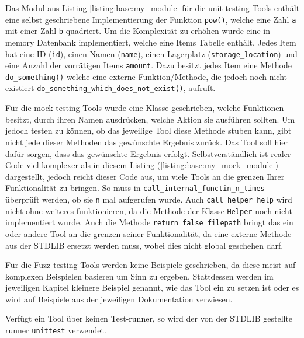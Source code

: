 Das Modul aus Listing \ref{listing:base:my_module} für die unit-testing Tools
enthält eine selbst geschriebene Implementierung der Funktion \lstinline|pow()|,
welche eine Zahl \lstinline|a| mit einer Zahl \lstinline|b| quadriert. Um die
Komplexität zu erhöhen wurde eine in-memory Datenbank implementiert, welche
eine Items Tabelle enthält. Jedes Item hat eine ID (\lstinline|id|), einen Namen
(\lstinline|name|), einen Lagerplatz (\lstinline|storage_location|) und eine
Anzahl der vorrätigen Items \lstinline|amount|. Dazu besitzt jedes Item eine
Methode \lstinline|do_something()| welche eine externe Funktion/Methode,
die jedoch noch nicht existiert \lstinline|do_something_which_does_not_exist()|,
aufruft.

Für die \gls{mock}-testing Tools wurde eine Klasse geschrieben, welche 
Funktionen besitzt, durch ihren Namen ausdrücken, welche Aktion sie ausführen 
sollten.
Um jedoch testen zu können, ob das jeweilige Tool diese Methode \gls{stub}en
kann, gibt nicht jede dieser Methoden das gewünschte Ergebnis zurück. Das Tool 
soll hier dafür sorgen, dass das gewünschte Ergebnis erfolgt.
Selbstverständlich ist realer Code viel komplexer als in diesem Listing
(\ref{listing:base:my_mock_module}) dargestellt, jedoch reicht dieser Code aus,
um viele Tools an die grenzen Ihrer Funktionalität zu bringen. So muss in
\lstinline{call_internal_functin_n_times} überprüft werden, ob sie \lstinline{n}
mal aufgerufen wurde. Auch \lstinline{call_helper_help} wird nicht ohne 
weiteres funktionieren, da die Methode der Klasse \lstinline{Helper} noch nicht 
implementiert wurde. Auch die Methode \lstinline{return_false_filepath}
bringt das ein oder andere Tool an die grenzen seiner Funktionalität, da eine 
externe Methode aus der STDLIB ersetzt werden muss, wobei dies nicht global 
geschehen darf.

Für die Fuzz-testing Tools werden keine Beispiele geschrieben, da diese meist 
auf komplexen Beispielen basieren um Sinn zu ergeben. Stattdessen werden im 
jeweiligen Kapitel kleinere Beispiel
genannt, wie das Tool ein zu setzen ist oder es wird auf Beispiele aus der 
jeweiligen Dokumentation
verwiesen.

Verfügt ein Tool über keinen Test-runner, so wird der von der STDLIB gestellte 
runner \lstinline{unittest} verwendet.